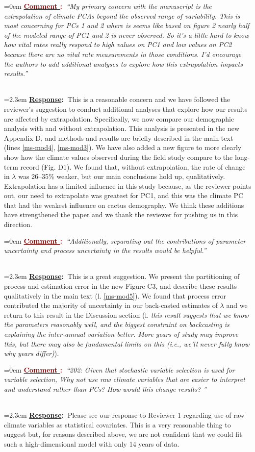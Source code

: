 \documentclass[12pt]{article}
\newcounter{cN}
\newcommand{\comment}[1]{
	\vspace{2em}
	\refstepcounter{cN} %
	\noindent \hangindent=0em \textbf{\textcolor{Maroon}{\uline{Comment \thecN}:~}}\emph{``#1''}
	}
\newcommand{\response}[1]{
	\\[0.25em]
	\hangindent=2.3em \textbf{\textcolor{NavyBlue}{\uline{Response}:~}}#1
	}
\begin{document}
\comment{My primary concern with the manuscript is the extrapolation of climate PCAs beyond the observed range of variability. This is most concerning for PCs 1 and 2 where is seems like based on figure 2 nearly half of the modeled range of PC1 and 2 is never observed. So it’s a little hard to know how vital rates really respond to high values on PC1 and low values on PC2 because there are no vital rate measurements in those conditions. I’d encourage the authors to add additional analyses to explore how this extrapolation impacts results.}
\response{This is a reasonable concern and we have followed the reviewer's suggestion to conduct additional analyses that explore how our results are affected by extrapolation.
Specifically, we now compare our demographic analysis with and without  extrapolation.
This analysis is presented in the new Appendix D, and methods and results are briefly described in the main text (lines \ref{ms-mod4}, \ref{ms-mod3}).
We have also added a new figure to more clearly show how the climate values observed during the field study compare to the long-term record (Fig. D1). 
We found that, without extrapolation, the rate of change in $\lambda$ was 26--35\% weaker, but our main conclusions hold up, qualitatively. 
Extrapolation has a limited influence in this study because, as the reviewer points out, our need to extrapolate was greatest for PC1, and this was the climate PC that had the weakest influence on cactus demography. 
We think these additions have strengthened the paper and we thank the reviewer for pushing us in this direction.
}

\comment{Additionally, separating out the contributions of parameter uncertainty and process uncertainty in the results would be helpful.}
\response{This is a great suggestion. 
We present the partitioning of process and estimation error in the new Figure C3, and describe these results qualitatively in the main text (l. \ref{ms-mod5}).
We found that process error contributed the majority of uncertainty in our back-casted estimates of $\lambda$ and we return to this result in the Discussion section (l. \textit{this result suggests that we know the parameters reasonably well, and the biggest constraint on backcasting is explaining the inter-annual variation better. More years of study may improve this, but there may also be fundamental limits on this (i.e., we'll never fully know why years differ)}).}

\comment{202: Given that stochastic variable selection is used for variable selection, Why not use raw climate variables that are easier to interpret and understand rather than PCs? How would this change results?
}
\response{Please see our response to Reviewer 1 regarding use of raw climate variables as statistical covariates. 
This is a very reasonable thing to suggest but, for reasons described above, we are not confident that we could fit such a high-dimensional model with only 14 years of data.}
\end{document}
